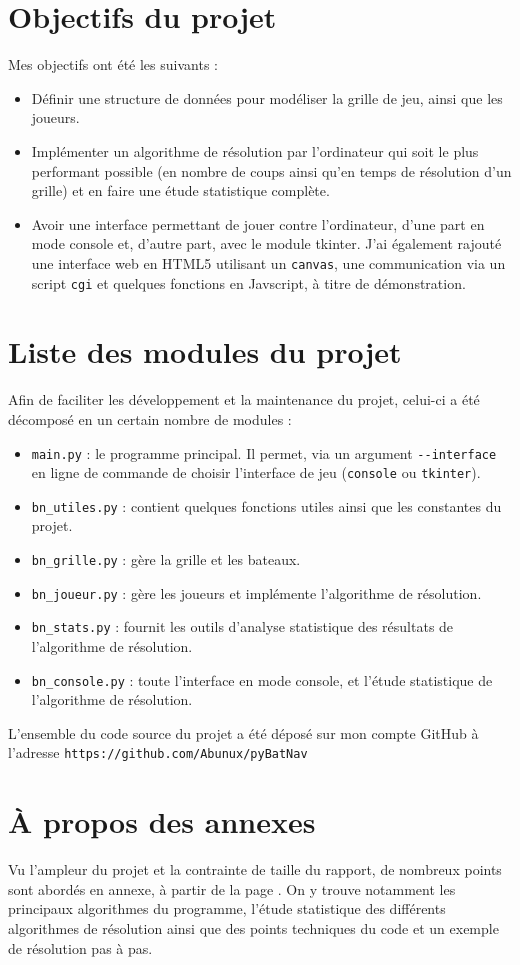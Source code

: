 \section{Objectifs du projet}
Mes objectifs ont été les suivants :
\begin{itemize}
\item Définir une structure de données pour modéliser la grille de jeu, ainsi que les joueurs.
\item Implémenter un algorithme de résolution par l'ordinateur qui soit le plus performant possible (en nombre de coups ainsi qu'en temps de résolution d'un grille) et en faire une étude statistique complète.
\item Avoir une interface permettant de jouer contre l'ordinateur, d'une part en mode console et, d'autre part, avec le module tkinter. J'ai également rajouté une interface web en HTML5 utilisant un \texttt{canvas}, une communication via un script \texttt{cgi} et quelques fonctions en Javscript, à titre de démonstration.
\end{itemize}

\section{Liste des modules du projet}
Afin de faciliter les développement et la maintenance du projet, celui-ci a été décomposé en un certain nombre de modules :
\begin{itemize}
\item \texttt{main.py} : le programme principal. Il permet, via un argument \texttt{-\hspace*{1pt}-interface} en ligne de commande de choisir l'interface de jeu (\texttt{console} ou \texttt{tkinter}).
\item \texttt{bn\_utiles.py} : contient quelques fonctions utiles ainsi que les constantes du projet.
\item \texttt{bn\_grille.py} : gère la grille et les bateaux.
\item \texttt{bn\_joueur.py} : gère les joueurs et implémente l'algorithme de résolution.
\item \texttt{bn\_stats.py} : fournit les outils d'analyse statistique des résultats de l'algorithme de résolution.
\item \texttt{bn\_console.py} : toute l'interface en mode console, et l'étude statistique de l'algorithme de résolution.
\end{itemize}

\bigskip

L'ensemble du code source du projet a été déposé sur mon compte GitHub à l'adresse \texttt{https://github.com/Abunux/pyBatNav}

\section{À propos des annexes}
Vu l'ampleur du projet et la contrainte de taille du rapport, de nombreux points sont abordés en annexe, à partir de la page \pageref{annexes}. On y trouve notamment les principaux algorithmes du programme, l'étude statistique des différents algorithmes de résolution ainsi que des points techniques du code et un exemple de résolution pas à pas.
